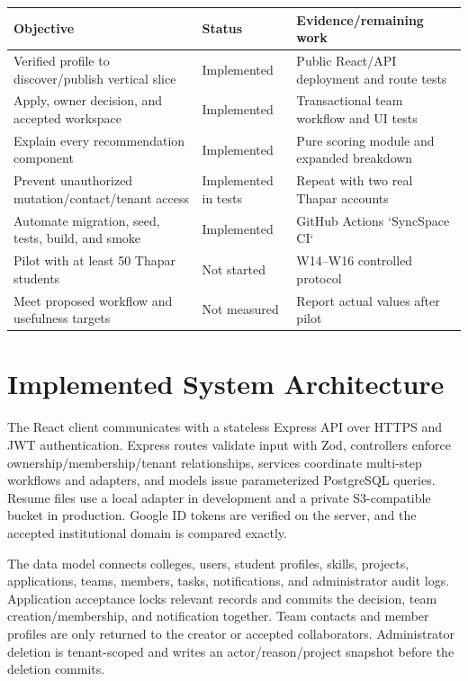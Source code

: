 \documentclass[11pt,a4paper]{article}
\begin{document}
\begin{tabularx}{\textwidth}{@{}p{}p{}X@{}}
\toprule
Objective & Status & Evidence/remaining work \\
\midrule
Verified profile to discover/publish vertical slice & Implemented & Public React/API deployment and route tests \\
Apply, owner decision, and accepted workspace & Implemented & Transactional team workflow and UI tests \\
Explain every recommendation component & Implemented & Pure scoring module and expanded breakdown \\
Prevent unauthorized mutation/contact/tenant access & Implemented in tests & Repeat with two real Thapar accounts \\
Automate migration, seed, tests, build, and smoke & Implemented & GitHub Actions `SyncSpace CI` \\
Pilot with at least 50 Thapar students & Not started & W14--W16 controlled protocol \\
Meet proposed workflow and usefulness targets & Not measured & Report actual values after pilot \\
\bottomrule
\end{tabularx}

\section{Implemented System Architecture}

The React client communicates with a stateless Express API over HTTPS and JWT authentication. Express routes validate input with Zod, controllers enforce ownership/membership/tenant relationships, services coordinate multi-step workflows and adapters, and models issue parameterized PostgreSQL queries. Resume files use a local adapter in development and a private S3-compatible bucket in production. Google ID tokens are verified on the server, and the accepted institutional domain is compared exactly.

The data model connects colleges, users, student profiles, skills, projects, applications, teams, members, tasks, notifications, and administrator audit logs. Application acceptance locks relevant records and commits the decision, team creation/membership, and notification together. Team contacts and member profiles are only returned to the creator or accepted collaborators. Administrator deletion is tenant-scoped and writes an actor/reason/project snapshot before the deletion commits.
\end{document}

